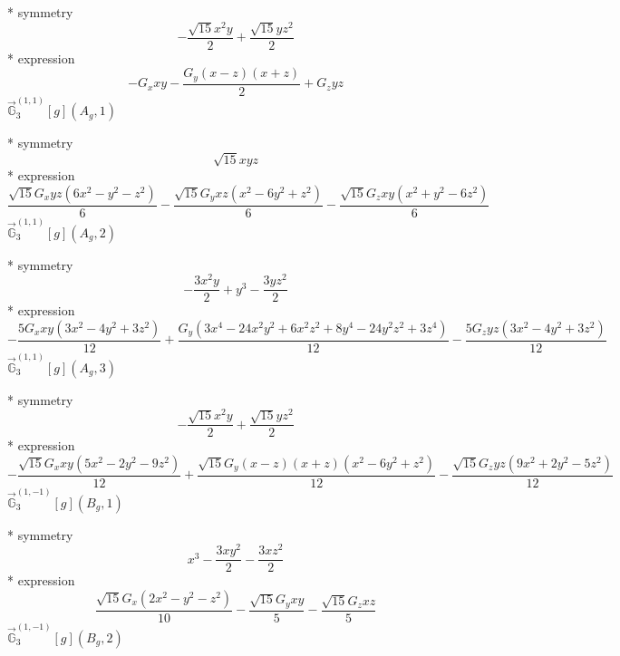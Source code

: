 \documentclass[fleqn,8pt]{jsarticle}
\begin{document}
\noindent\quad ** symmetry
\begin{dmath*}
- \frac{\sqrt{15} x^{2} y}{2} + \frac{\sqrt{15} y z^{2}}{2}
\end{dmath*}
\noindent\quad ** expression
\begin{dmath*}
- G_{x} x y - \frac{G_{y} \left(x - z\right) \left(x + z\right)}{2} + G_{z} y z
\end{dmath*}
\noindent\quad $\vec{\mathbb{G}}_{3}^{(1,1)}[g](A_{g},1)$

\noindent\quad ** symmetry
\begin{dmath*}
\sqrt{15} x y z
\end{dmath*}
\noindent\quad ** expression
\begin{dmath*}
\frac{\sqrt{15} G_{x} y z \left(6 x^{2} - y^{2} - z^{2}\right)}{6} - \frac{\sqrt{15} G_{y} x z \left(x^{2} - 6 y^{2} + z^{2}\right)}{6} - \frac{\sqrt{15} G_{z} x y \left(x^{2} + y^{2} - 6 z^{2}\right)}{6}
\end{dmath*}
\noindent\quad $\vec{\mathbb{G}}_{3}^{(1,1)}[g](A_{g},2)$

\noindent\quad ** symmetry
\begin{dmath*}
- \frac{3 x^{2} y}{2} + y^{3} - \frac{3 y z^{2}}{2}
\end{dmath*}
\noindent\quad ** expression
\begin{dmath*}
- \frac{5 G_{x} x y \left(3 x^{2} - 4 y^{2} + 3 z^{2}\right)}{12} + \frac{G_{y} \left(3 x^{4} - 24 x^{2} y^{2} + 6 x^{2} z^{2} + 8 y^{4} - 24 y^{2} z^{2} + 3 z^{4}\right)}{12} - \frac{5 G_{z} y z \left(3 x^{2} - 4 y^{2} + 3 z^{2}\right)}{12}
\end{dmath*}
\noindent\quad $\vec{\mathbb{G}}_{3}^{(1,1)}[g](A_{g},3)$

\noindent\quad ** symmetry
\begin{dmath*}
- \frac{\sqrt{15} x^{2} y}{2} + \frac{\sqrt{15} y z^{2}}{2}
\end{dmath*}
\noindent\quad ** expression
\begin{dmath*}
- \frac{\sqrt{15} G_{x} x y \left(5 x^{2} - 2 y^{2} - 9 z^{2}\right)}{12} + \frac{\sqrt{15} G_{y} \left(x - z\right) \left(x + z\right) \left(x^{2} - 6 y^{2} + z^{2}\right)}{12} - \frac{\sqrt{15} G_{z} y z \left(9 x^{2} + 2 y^{2} - 5 z^{2}\right)}{12}
\end{dmath*}
\noindent\quad $\vec{\mathbb{G}}_{3}^{(1,-1)}[g](B_{g},1)$

\noindent\quad ** symmetry
\begin{dmath*}
x^{3} - \frac{3 x y^{2}}{2} - \frac{3 x z^{2}}{2}
\end{dmath*}
\noindent\quad ** expression
\begin{dmath*}
\frac{\sqrt{15} G_{x} \left(2 x^{2} - y^{2} - z^{2}\right)}{10} - \frac{\sqrt{15} G_{y} x y}{5} - \frac{\sqrt{15} G_{z} x z}{5}
\end{dmath*}
\noindent\quad $\vec{\mathbb{G}}_{3}^{(1,-1)}[g](B_{g},2)$
\end{document}
